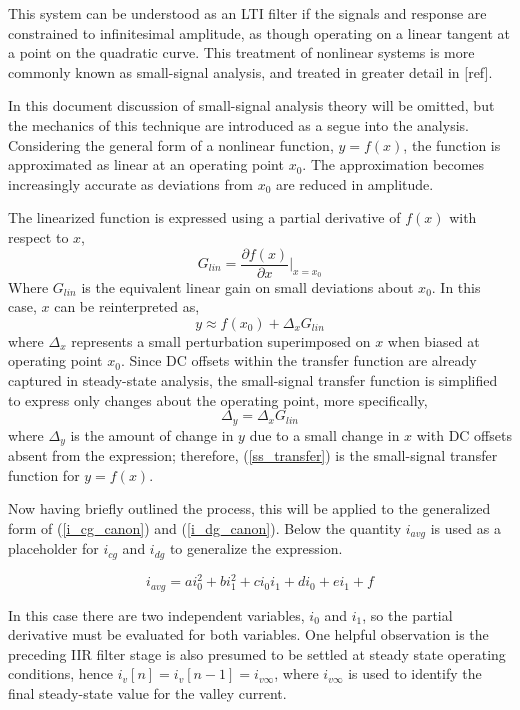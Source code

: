 \documentclass[conference]{IEEEtran}
\begin{document}
This system can be understood as an LTI filter if the signals and response are constrained to infinitesimal amplitude, as though operating on a linear tangent at a point on the quadratic curve. This treatment of nonlinear systems is more commonly known as small-signal analysis, and treated in greater detail in [ref].

In this document discussion of small-signal analysis theory will be omitted, but the mechanics of this technique are introduced as a segue into the analysis.  Considering the general form of a nonlinear function, $y = f(x)$, the function is approximated as linear at an operating point $x_0$.  The approximation becomes increasingly accurate as deviations from $x_0$ are reduced in amplitude.

The linearized function is expressed using a partial derivative of $f(x)$ with respect to $x$,
\begin{equation}
	G_{lin} = \frac{\partial f(x)}{\partial x}\bigg|_{x=x_0}
\end{equation}
Where $G_{lin}$ is the equivalent linear gain on small deviations about $x_0$. In this case, $x$ can be reinterpreted as,
\begin{equation}
y \approx f(x_0) + \Delta_x G_{lin}
\end{equation}
where $\Delta_x$ represents a small perturbation superimposed on $x$ when biased at operating point $x_0$.  Since DC offsets within the transfer function are already captured in steady-state analysis, the small-signal transfer function is simplified to express only changes about the operating point, more specifically,
 \begin{equation}
 \Delta_y = \Delta_x G_{lin} \label{ss_transfer}
 \end{equation}
where $\Delta_y$ is the amount of change in $y$ due to a small change in $x$ with DC offsets absent from the expression; therefore, (\ref{ss_transfer}) is the small-signal transfer function for $y=f(x)$.

Now having briefly outlined the process, this will be applied to the generalized form of (\ref{i_cg_canon}) and (\ref{i_dg_canon}). Below the quantity $i_{avg}$ is used as a placeholder for $i_{cg}$ and $i_{dg}$ to generalize the expression.

\begin{equation}
i_{avg} = a i_0^2+b i_1^2+c i_0i_1+d i_0+e i_1+f  \label{i_av_gen}
\end{equation}

In this case there are two independent variables, $i_0$ and $i_1$, so the partial derivative must be evaluated for both variables. One helpful observation is the preceding IIR filter stage is also presumed to be settled at steady state operating conditions, hence $i_v[n] = i_v[n-1] = i_{v\infty}$, where $i_{v\infty}$ is used to identify the final steady-state value for the valley current.
\end{document}
